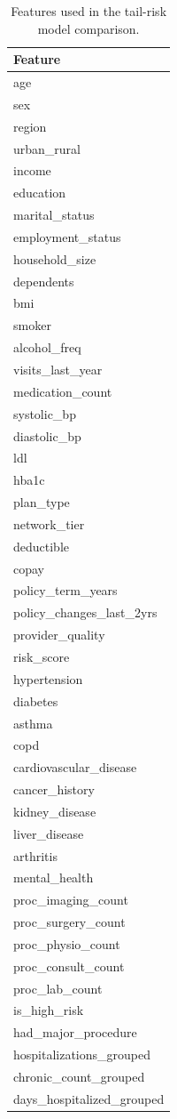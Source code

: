 \begin{table}
\caption{Features used in the tail-risk model comparison.}
\label{tab:08-tail-risk-model-features}
\begin{tabular}{l}
\toprule
Feature \\
\midrule
age \\
sex \\
region \\
urban_rural \\
income \\
education \\
marital_status \\
employment_status \\
household_size \\
dependents \\
bmi \\
smoker \\
alcohol_freq \\
visits_last_year \\
medication_count \\
systolic_bp \\
diastolic_bp \\
ldl \\
hba1c \\
plan_type \\
network_tier \\
deductible \\
copay \\
policy_term_years \\
policy_changes_last_2yrs \\
provider_quality \\
risk_score \\
hypertension \\
diabetes \\
asthma \\
copd \\
cardiovascular_disease \\
cancer_history \\
kidney_disease \\
liver_disease \\
arthritis \\
mental_health \\
proc_imaging_count \\
proc_surgery_count \\
proc_physio_count \\
proc_consult_count \\
proc_lab_count \\
is_high_risk \\
had_major_procedure \\
hospitalizations_grouped \\
chronic_count_grouped \\
days_hospitalized_grouped \\
\bottomrule
\end{tabular}
\end{table}
